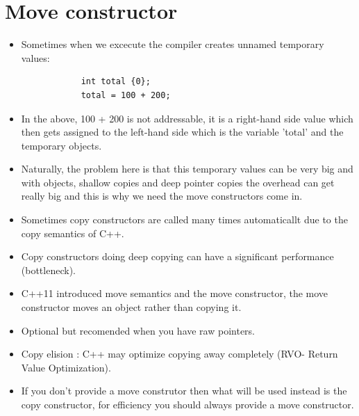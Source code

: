\section{Move constructor}
\begin{itemize}
    \item Sometimes when we excecute the compiler creates unnamed temporary values:
        \begin{verbatim}
            int total {0};
            total = 100 + 200;
        \end{verbatim}
    
    \item In the above, 100 + 200 is not addressable, it is a right-hand side value which then gets assigned to the left-hand side which is the variable 'total' and the temporary objects.
    \item Naturally, the problem here is that this temporary values can be very big and with objects, shallow copies and deep pointer copies the overhead can get really big and this is why we need the move constructors come in.
    \item Sometimes copy constructors are called many times automaticallt due to the copy semantics of C++.
    \item Copy constructors doing deep copying can have a significant performance (bottleneck).
    \item C++11 introduced move semantics and the move constructor, the move constructor moves an object rather than copying it.
    \item Optional but recomended when you have raw pointers.
    \item Copy elision : C++ may optimize copying away completely (RVO- Return Value Optimization).
    \item If you don't provide a move construtor then what will be used instead is the copy constructor, for efficiency you should always provide a move constructor.
\end{itemize}

